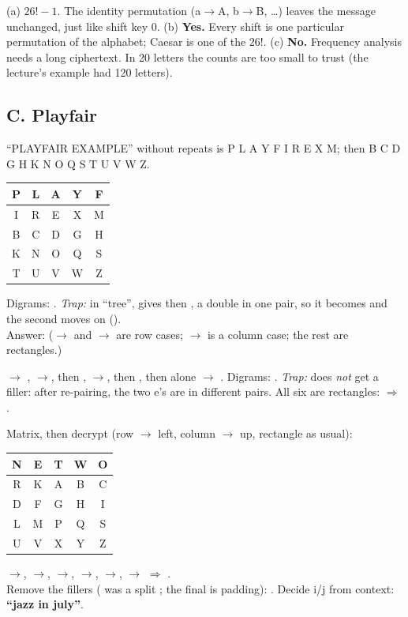 \ans (a) $26! - 1$. The identity permutation (a$\to$A, b$\to$B, \dots) leaves the message unchanged, just like shift key 0.
(b) \textbf{Yes.} Every shift is one particular permutation of the alphabet; Caesar is one of the $26!$.
(c) \textbf{No.} Frequency analysis needs a long ciphertext. In 20 letters the counts are too small to trust (the lecture's example had 120 letters).

\subsection*{C. Playfair}

\ans ``PLAYFAIR EXAMPLE'' without repeats is P L A Y F I R E X M; then B C D G H K N O Q S T U V W Z.
\begin{center}\small\begin{tabular}{|*{5}{c|}}\hline P&L&A&Y&F\\\hline I&R&E&X&M\\\hline B&C&D&G&H\\\hline K&N&O&Q&S\\\hline T&U&V&W&Z\\\hline\end{tabular}\end{center}
Digrams: .
\emph{Trap:} in ``tree'',  gives  then , a double in one pair, so it becomes  and the second  moves on ().\\
Answer: \textbf{}\;
($\to$ and $\to$ are row cases; $\to$ is a column case; the rest are rectangles.)

\ans {} $\to$ , $\to$, then , $\to$, then , then  alone $\to$ .
Digrams: \textbf{}.
\emph{Trap:}  does \emph{not} get a filler: after re-pairing, the two e's are in different pairs.
All six are rectangles: \textbf{} $\Rightarrow$ \textbf{}.

\ans Matrix, then decrypt (row $\to$ left, column $\to$ up, rectangle as usual):
\begin{center}\small\begin{tabular}{|*{5}{c|}}\hline N&E&T&W&O\\\hline R&K&A&B&C\\\hline D&F&G&H&I\\\hline L&M&P&Q&S\\\hline U&V&X&Y&Z\\\hline\end{tabular}\end{center}
$\to$,\; $\to$,\; $\to$,\; $\to$,\; $\to$,\; $\to$\;
$\Rightarrow$ .\\
Remove the fillers ( was a split ; the final  is padding): . Decide i/j from context: \textbf{``jazz in july''}.

